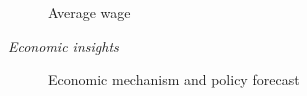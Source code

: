 \begin{frame}
  \begin{figure}
  \caption{Average wage}
  \end{figure}
\end{frame}
\begin{frame}\begin{center}
		\LARGE\textit{Economic insights}
\end{center}\end{frame}
\begin{frame}
  \begin{figure}[h!]\centering
  \caption{Economic mechanism and policy forecast}\label{Economic mechanism and policy forecast}
  \hspace{0.3cm}
  \end{figure}
\end{frame}
